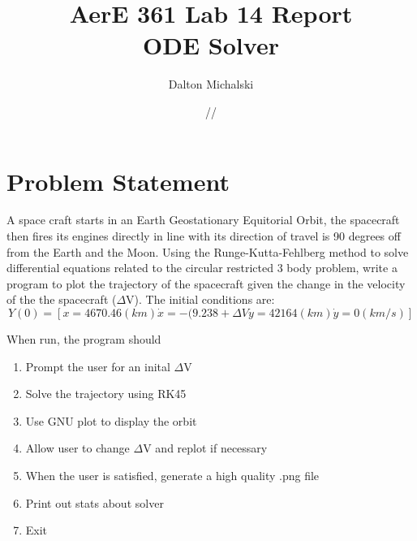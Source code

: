 \documentclass[11pt]{report}
\title{\textbf{AerE 361 Lab 14 Report \\ ODE Solver}}
\author{Dalton Michalski}
\date{\oldstylenums{12}/\oldstylenums{7}/\oldstylenums{2018}}
\begin{document}
\maketitle
 
\section{Problem Statement}
\begin{item} A space craft starts in an Earth Geostationary Equitorial Orbit, the spacecraft then fires its engines directly in line with its direction of travel is 90 degrees off from the Earth and the Moon. Using the Runge-Kutta-Fehlberg method to solve differential equations related to the circular restricted 3 body problem, write a program to plot the trajectory of the spacecraft given the change in the velocity of the the spacecraft ($\Delta$V). The initial conditions are:
\begin{equation}
    Y(0) = [ x = 4670.46 (km) \dot{x} = -(9.238 + \Delta V  y = 42164 (km) \dot{y} = 0(km/s)]
\end{equation}
\item When run, the program should 
\begin{enumerate}
    \item Prompt the user for an inital $\Delta$V
    \item Solve the trajectory using RK45
    \item Use GNU plot to display the orbit
    \item Allow user to change $\Delta$V and replot if necessary
    \item When the user is satisfied, generate a high quality .png file
    \item Print out stats about solver
    \item Exit
\end{enumerate}
\end{item}
\newpage
\end{document}
